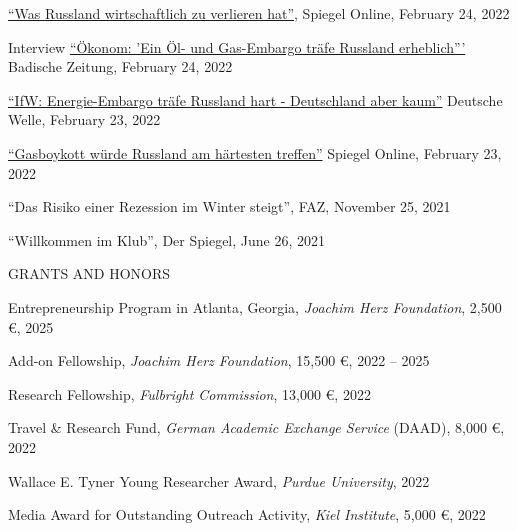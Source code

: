 \documentclass{article}
\begin{document}
\begin{minipage}[t]{0.8\textwidth}
    \href{https://www.spiegel.de/wirtschaft/russland-und-die-eu-was-russland-wirtschaftlich-zu-verlieren-hat-a-09eb6357-9607-45f8-bfb8-d39ef5e71b86}{``Was Russland wirtschaftlich zu verlieren hat''}, Spiegel Online, February 24, 2022 \par
    Interview \href{https://www.badische-zeitung.de/die-russland-sanktionen-sind-noch-nicht-die-ganz-grosse-keule--209731804.html}{``Ökonom: 'Ein Öl- und Gas-Embargo träfe Russland erheblich'''} Badische Zeitung, February 24, 2022 \par
    \href{https://www.dw.com/de/ifw-energie-embargo-tr\%C3\%A4fe-russland-hart-deutschland-aber-kaum/a-60885585}{``IfW: Energie-Embargo träfe Russland hart - Deutschland aber kaum''} Deutsche Welle, February 23, 2022 \par
    \href{https://www.spiegel.de/wirtschaft/unternehmen/sanktionen-wegen-ukraine-eskalation-gas-boykott-wuerde-russland-am-haertesten-treffen-a-d28dc387-1c8b-498d-9470-ef15043fac74}{``Gasboykott würde Russland am härtesten treffen''} Spiegel Online, February 23, 2022 \par
    ``Das Risiko einer Rezession im Winter steigt'', FAZ, November 25, 2021 \par
    ``Willkommen im Klub'', Der Spiegel, June 26, 2021 \par
\end{minipage}
\medskip


\begin{minipage}[t]{0.12\textwidth}
    {\selectfont GRANTS AND HONORS} \\
\end{minipage}
\hspace{5mm}
\begin{minipage}[t]{0.8\textwidth}
    Entrepreneurship Program in Atlanta, Georgia, \emph{Joachim Herz Foundation}, 2,500 \euro{}, 2025 \par
    Add-on Fellowship, \emph{Joachim Herz Foundation}, 15,500 \euro{}, 2022 -- 2025 \par
    Research Fellowship, \emph{Fulbright Commission}, 13,000 \euro{}, 2022 \par
    Travel \& Research Fund, \emph{German Academic Exchange Service} (DAAD), 8,000 \euro{}, 2022 \par
    Wallace E. Tyner Young Researcher Award, \emph{Purdue University}, 2022 \par
    Media Award for Outstanding Outreach Activity, \emph{Kiel Institute}, 5,000 \euro{}, 2022 \par
\end{minipage}
\medskip
\end{document}
